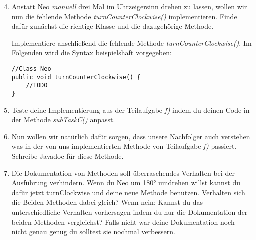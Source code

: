 \begin{enumerate}[label=\alph*)] \setcounter{enumi}{3}
    \item Anstatt Neo \textit{manuell} drei Mal im Uhrzeigersinn drehen zu lassen, wollen wir nun die fehlende Methode \textit{turnCounterClockwise()}
    implementieren. Finde dafür zunächst die richtige Klasse und die dazugehörige Methode. \par
    Implementiere anschließend die fehlende Methode \textit{turnCounterClockwise()}. Im Folgenden wird die Syntax beispielshaft vorgegeben:
    \begin{lstlisting}
//Class Neo
public void turnCounterClockwise() {
    //TODO
}
    \end{lstlisting}
    \item Teste deine Implementierung aus der Teilaufgabe \textit{f)} indem du deinen Code in der Methode \textit{subTaskC()} anpasst.
    \item Nun wollen wir natürlich dafür sorgen, dass unsere Nachfolger auch verstehen was in der von uns implementierten Methode von 
    Teilaufgabe \textit{f)} passiert. Schreibe Javadoc für diese Methode.
    \item Die Dokumentation von Methoden soll überraschendes Verhalten bei der Ausführung verhindern. 
    Wenn du Neo um 180° umdrehen willst kannst du dafür jetzt turnClockwise und deine neue Methode benutzen. 
    Verhalten sich die Beiden Methoden dabei gleich?
    Wenn nein: Kannst du das unterschiedliche Verhalten vorhersagen indem du nur die Dokumentation der beiden Methoden vergleichst?
    Falls nicht war deine Dokumentation noch nicht genau genug du solltest sie nochmal verbessern.
\end{enumerate}
